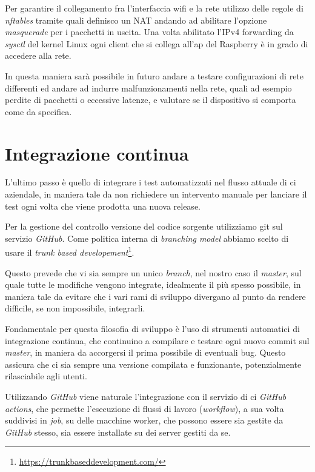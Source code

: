 \documentclass[12pt,a4paper,twoside,titlepage]{book}
\begin{document}
Per garantire il collegamento fra l'interfaccia \Gls{wifi} e la rete utilizzo delle 
regole di \textit{nftables} tramite quali definisco un NAT andando ad abilitare l'opzione
\textit{masquerade} per i pacchetti in uscita. Una volta abilitato l'IPv4
forwarding da \textit{sysctl} del kernel Linux ogni client che si collega all'\acrshort{ap}
del Raspberry è in grado di accedere alla rete. 

In questa maniera sarà possibile in futuro andare a testare configurazioni
di rete differenti ed andare ad indurre malfunzionamenti nella rete, quali ad esempio
perdite di pacchetti o eccessive latenze, e valutare se il dispositivo si comporta come
da specifica.

\section{Integrazione continua}

L'ultimo passo è quello di integrare i test automatizzati nel flusso attuale 
di \acrfull{ci} aziendale, in maniera tale da non richiedere 
un intervento manuale per lanciare il test ogni volta che viene prodotta una nuova release. 

Per la gestione del controllo versione del codice sorgente utilizziamo \Gls{git}
sul servizio \textit{GitHub}. Come politica interna di 
\textit{branching model} abbiamo scelto di usare il \textit{trunk based developement}\footnote{\url{https://trunkbaseddevelopment.com/}}. 

Questo prevede che vi sia sempre un unico \textit{branch}, nel nostro caso il \textit{master}, sul 
quale tutte le modifiche vengono integrate, idealmente il più spesso possibile, in 
maniera tale da evitare che i vari rami di sviluppo divergano al punto da rendere difficile,
se non impossibile, integrarli.

Fondamentale per questa filosofia di sviluppo è l'uso di strumenti automatici di integrazione continua,
che continuino a compilare e testare ogni nuovo commit sul \textit{master}, in maniera 
da accorgersi il prima possibile di eventuali bug. Questo assicura che 
ci sia sempre una versione compilata e funzionante, potenzialmente rilasciabile agli utenti. 

Utilizzando \textit{GitHub} viene naturale l'integrazione con il servizio di \acrshort{ci} 
\textit{GitHub actions}, che permette l'esecuzione di flussi di lavoro (\textit{workflow}), 
a sua volta suddivisi in \textit{job}, su delle macchine worker, che possono essere sia 
gestite da \textit{GitHub} stesso, sia essere installate su dei server gestiti da se. 
\end{document}
